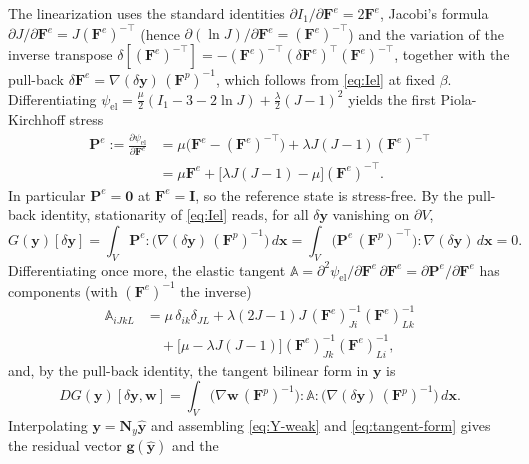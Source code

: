 \documentclass[12pt]{article}
\theoremstyle{plain}
\theoremstyle{definition}
\newcommand{\bF}{\bm{F}}
\newcommand{\by}{\bm{y}}
\newcommand{\bx}{\bm{x}}
\newcommand{\bI}{\bm{I}}
\newcommand{\bN}{\bm{N}}
\newcommand{\Fe}{\bF^{e}}
\newcommand{\Fp}{\bF^{p}}
\newcommand{\Pe}{\bm{P}^{e}}
\begin{document}
The linearization uses the standard identities
$\partial I_1/\partial\Fe=2\Fe$, Jacobi's formula
$\partial J/\partial\Fe=J(\Fe)^{-\top}$ (hence
$\partial(\ln J)/\partial\Fe=(\Fe)^{-\top}$) and the variation of the inverse
transpose
$\delta[(\Fe)^{-\top}]=-(\Fe)^{-\top}(\delta\Fe)^{\!\top}(\Fe)^{-\top}$,
together with the pull-back
$\delta\Fe=\nabla(\delta\by)\,(\Fp)^{-1}$, which follows from \eqref{eq:Iel} at
fixed $\beta$. Differentiating
$\psi_{\mathrm{el}}=\frac{\mu}{2}(I_1-3-2\ln J)+\frac{\lambda}{2}(J-1)^2$
yields the first Piola-Kirchhoff stress
\begin{equation}\label{eq:Pe}
\begin{split}
  \Pe:=\frac{\partial\psi_{\mathrm{el}}}{\partial\Fe}
  &=\mu\bigl(\Fe-(\Fe)^{-\top}\bigr)+\lambda J(J-1)(\Fe)^{-\top}\\
  &=\mu\Fe+\bigl[\lambda J(J-1)-\mu\bigr](\Fe)^{-\top}.
\end{split}
\end{equation}
In particular $\Pe=\bm0$ at $\Fe=\bI$, so the reference state is stress-free.
By the pull-back identity, stationarity of \eqref{eq:Iel} reads, for all
$\delta\by$ vanishing on $\partial V$,
\begin{equation}\label{eq:Y-weak}
  G(\by)[\delta\by]
  =\int_{V}\Pe:\bigl(\nabla(\delta\by)\,(\Fp)^{-1}\bigr)\,d\bx
  =\int_{V}\bigl(\Pe\,(\Fp)^{-\top}\bigr):\nabla(\delta\by)\,d\bx=0 .
\end{equation}
Differentiating once more, the elastic tangent
$\mathbb{A}=\partial^{2}\psi_{\mathrm{el}}/\partial\Fe\,\partial\Fe
=\partial\Pe/\partial\Fe$ has components (with $(\Fe)^{-1}$ the inverse)
\begin{equation}\label{eq:Amod}
\begin{split}
  \mathbb{A}_{iJkL}
  &=\mu\,\delta_{ik}\delta_{JL}
  +\lambda(2J-1)J\,(\Fe)^{-1}_{Ji}(\Fe)^{-1}_{Lk}\\
  &\quad+\bigl[\mu-\lambda J(J-1)\bigr](\Fe)^{-1}_{Jk}(\Fe)^{-1}_{Li},
\end{split}
\end{equation}
and, by the pull-back identity, the tangent bilinear form in $\by$ is
\begin{equation}\label{eq:tangent-form}
  DG(\by)[\delta\by,\bm{w}]
  =\int_{V}\bigl(\nabla\bm{w}\,(\Fp)^{-1}\bigr):\mathbb{A}:
  \bigl(\nabla(\delta\by)\,(\Fp)^{-1}\bigr)\,d\bx .
\end{equation}
Interpolating $\by=\bN_{\!y}\hat{\by}$ and assembling \eqref{eq:Y-weak} and
\eqref{eq:tangent-form} gives the residual vector $\bm{g}(\hat{\by})$ and the
\end{document}
